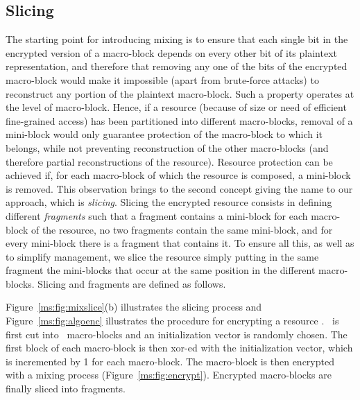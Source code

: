 \subsection{Slicing}

The starting point for introducing mixing is to ensure that each single bit in the encrypted version of a macro-block depends on every other bit of its plaintext representation, and therefore that removing any one of the bits of the encrypted macro-block would make it impossible (apart from brute-force attacks) to reconstruct any portion of the plaintext macro-block. Such a property operates at the level of macro-block. Hence, if a resource (because of size or need of efficient fine-grained access) has been partitioned into different macro-blocks, removal of a mini-block would only guarantee protection of the macro-block to which it belongs, while not preventing reconstruction of the other macro-blocks (and therefore partial reconstructions of the resource). Resource protection can be achieved if, for each macro-block of which the resource is composed, a mini-block is removed. This observation brings to the second concept giving the name to our approach, which is {\em slicing}. Slicing the encrypted resource consists in defining different {\em fragments} such that a fragment contains a mini-block for each macro-block of the resource, no two fragments contain the same mini-block, and for every mini-block there is a fragment that contains it. To ensure all this, as well as to simplify management, we slice the resource simply putting in the same fragment the mini-blocks that occur at the same position in the different macro-blocks. Slicing and fragments are defined as follows.

\begin{dfn}
\end{dfn}

Figure~\ref{ms:fig:mixslice}(b) illustrates the slicing process and Figure~\ref{ms:fig:algoenc} illustrates the procedure for encrypting a resource \resource. \resource\ is first cut into \Mnum\ macro-blocks and an initialization vector is randomly chosen. The first block of each macro-block is then {\sc xor}-ed with the initialization vector, which is incremented by 1 for each macro-block. The macro-block is then encrypted with a mixing process (Figure~\ref{ms:fig:encrypt}). Encrypted macro-blocks are finally sliced into fragments.
